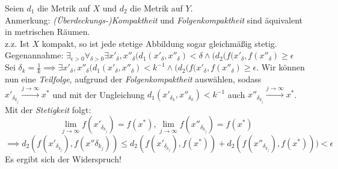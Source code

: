 \documentclass{scrartcl}
\begin{document}
\setcounter{section}{6}
\setcounter{aufgabe}{1}
\begin{aufgabe}
Seien $ d_1 $ die Metrik auf $ X $ und $ d_2 $ die Metrik auf $ Y $.\\
 Anmerkung: \emph{(Überdeckungs-)Kompaktheit} und \emph{Folgenkompaktheit} sind äquivalent in metrischen Räumen.\\
z.z. Ist $ X $ kompakt, so ist jede stetige Abbildung sogar gleichmäßig stetig.\\
Gegenannahme: $ \exists_{\epsilon>0} \forall_{\delta>0} \exists {x'}_{\delta},{x''}_{\delta} (d_1(x'_{\delta},x''_{\delta})<\delta \land (d_2(f(x'_{\delta}, f(x''_\delta)\ge \epsilon $\\
Sei $ \delta_k =\frac{1}{k} \implies  \exists {x'}_{\delta},{x''}_{\delta} (d_1(x'_{\delta},x''_{\delta})<k^{-1} \land (d_2(f(x'_{\delta}, f(x''_\delta)\ge \epsilon  $.  
Wir können nun eine \emph{Teilfolge}, aufgrund der \emph{Folgenkompaktheit} auswählen, sodass $ x'_{\delta_{k_j}}\stackrel{j\to \infty}\to x^* $ und mit der Ungleichung $ d_1(x'_{\delta_k}, x''_{\delta_k})<k^{-1} $ auch $ x''_{\delta_{k_j}} \stackrel{j\to \infty}\to x^* $. Mit der \emph{Stetigkeit} folgt:
\[
\lim_{j\to \infty} f(x'_{\delta_{k_j}})= f(x^*), 
\lim_{j\to \infty} f(x''_{\delta_{k_j}})= f(x^*) 
\]
\[
\implies d_2(f(x'_{\delta_{k_j}}), f(x''{\delta_{k_j}}))\le d_2(f(x'_{\delta_{k_j}}), 
f(x^*))+d_2(f(x''_{\delta_{k_j}}), f(x^*)))<\epsilon
\]
Es ergibt sich der Widerspruch!
\end{aufgabe}
\end{document}

